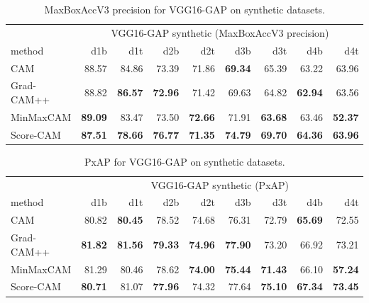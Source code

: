 \begin{table}[ht]
\centering
\begin{tabular}{lrrrrrrrr}
\toprule
 & \multicolumn{8}{c}{VGG16-GAP synthetic (MaxBoxAccV3 precision)} \\
method & d1b & d1t & d2b & d2t & d3b & d3t & d4b & d4t \\
\cmidrule(lr){1-1} \cmidrule(lr){2-9} 
CAM & 88.57 & 84.86 & 73.39 & 71.86 & \color{purple} \bfseries 69.34 & 65.39 & 63.22 & 63.96 \\
Grad-CAM++ & 88.82 & \color{teal} \bfseries 86.57 & \color{purple} \bfseries 72.96 & 71.42 & 69.63 & 64.82 & \color{purple} \bfseries 62.94 & 63.56 \\
MinMaxCAM & \color{teal} \bfseries 89.09 & 83.47 & 73.50 & \color{teal} \bfseries 72.66 & 71.91 & \color{purple} \bfseries 63.68 & 63.46 & \color{purple} \bfseries 52.37 \\
Score-CAM & \color{purple} \bfseries 87.51 & \color{purple} \bfseries 78.66 & \color{teal} \bfseries 76.77 & \color{purple} \bfseries 71.35 & \color{teal} \bfseries 74.79 & \color{teal} \bfseries 69.70 & \color{teal} \bfseries 64.36 & \color{teal} \bfseries 63.96 \\
\bottomrule
\end{tabular}
\caption[MaxBoxAccV3 for VGG16-GAP on synthetic datasets]{MaxBoxAccV3 precision for VGG16-GAP on synthetic datasets.}
\label{tab:maxboxaccv3_precision_vgg16_gap_synthetic}
\end{table}

\begin{table}[ht]
\centering
\begin{tabular}{lrrrrrrrr}
\toprule
 & \multicolumn{8}{c}{VGG16-GAP synthetic (PxAP)} \\
method & d1b & d1t & d2b & d2t & d3b & d3t & d4b & d4t \\
\cmidrule(lr){1-1} \cmidrule(lr){2-9} 
CAM & 80.82 & \color{purple} \bfseries 80.45 & 78.52 & 74.68 & 76.31 & 72.79 & \color{purple} \bfseries 65.69 & 72.55 \\
Grad-CAM++ & \color{teal} \bfseries 81.82 & \color{teal} \bfseries 81.56 & \color{teal} \bfseries 79.33 & \color{teal} \bfseries 74.96 & \color{teal} \bfseries 77.90 & 73.20 & 66.92 & 73.21 \\
MinMaxCAM & 81.29 & 80.46 & 78.62 & \color{purple} \bfseries 74.00 & \color{purple} \bfseries 75.44 & \color{purple} \bfseries 71.43 & 66.10 & \color{purple} \bfseries 57.24 \\
Score-CAM & \color{purple} \bfseries 80.71 & 81.07 & \color{purple} \bfseries 77.96 & 74.32 & 77.64 & \color{teal} \bfseries 75.10 & \color{teal} \bfseries 67.34 & \color{teal} \bfseries 73.45 \\
\bottomrule
\end{tabular}
\caption[PxAP for VGG16-GAP on synthetic datasets]{PxAP for VGG16-GAP on synthetic datasets.}
\label{tab:pxap_vgg16_gap_synthetic}
\end{table}

